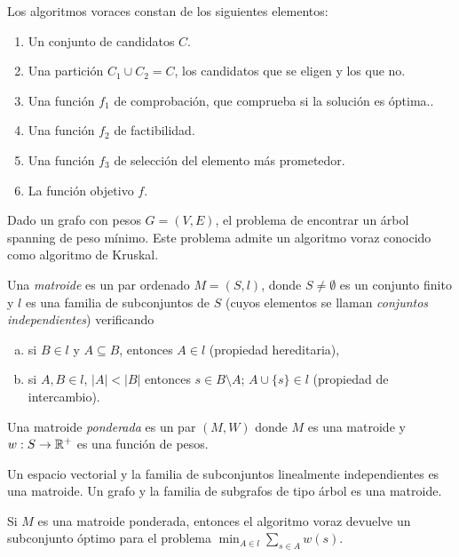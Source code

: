\documentclass[AL.tex]{subfiles}
\begin{document}
Los algoritmos voraces constan de los siguientes elementos:
\begin{enumerate}
\item Un conjunto de candidatos $C$.
\item
 Una partición $C_1\cup C_2=C$, los candidatos que se eligen y los que no.
 \item  Una función $f_1$ de comprobación, que comprueba si la solución es óptima..
 \item Una función $f_2$ de factibilidad.
 \item Una función $f_3$ de selección del elemento más prometedor.
 \item La función objetivo $f$.
 \end{enumerate}
 
 
\begin{ej}
Dado un grafo con pesos $G=(V,E)$, el problema de encontrar un árbol spanning de peso mínimo. Este problema admite un algoritmo voraz conocido como algoritmo de Kruskal. 
\end{ej}

\begin{defi}
Una \emph{matroide} es un par ordenado $M=(S,l)$, donde $S\neq\emptyset$ es un conjunto finito y $l$ es una familia de subconjuntos de $S$ (cuyos elementos se llaman \emph{conjuntos independientes}) verificando
\begin{enumerate}[a)]
\item si $B\in l$ y $A\subseteq B$, entonces $A\in l$ (propiedad hereditaria),
\item si $A,B\in l$, $|A|<|B|$ entonces $s\in B\setminus A$; $A\cup\{s\}\in l$ (propiedad de intercambio).
\end{enumerate}
Una matroide \emph{ponderada} es un par $(M,W)$ donde $M$ es una matroide y $w:S\to\mathbb{R}^+$ es una función de pesos.
\end{defi}


\begin{ej}
Un espacio vectorial y la familia de subconjuntos linealmente independientes es una matroide. Un grafo y la familia de subgrafos de tipo árbol es una matroide.
\end{ej}

\begin{teorema}
Si $M$ es una matroide ponderada, entonces el algoritmo voraz devuelve un subconjunto óptimo para el problema $\min_{A\in l}\sum_{s\in A}w(s)$. 
\end{teorema}

\end{document}
